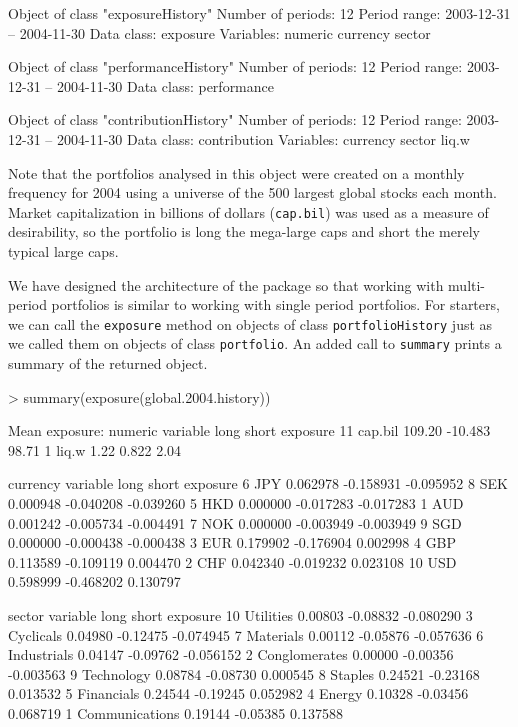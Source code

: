 \documentclass[a4paper]{report}
\begin{document}
\begin{article}
\begin{Schunk}
\begin{Soutput}
Object of class "exposureHistory"
Number of periods: 12 
Period range: 2003-12-31 -- 2004-11-30 
Data class: exposure 
Variables: numeric currency sector 

Object of class "performanceHistory"
Number of periods: 12 
Period range: 2003-12-31 -- 2004-11-30 
Data class: performance 

Object of class "contributionHistory"
Number of periods: 12 
Period range: 2003-12-31 -- 2004-11-30 
Data class: contribution 
Variables: currency sector liq.w 
\end{Soutput}
\end{Schunk}

Note that the portfolios analysed in this object were created on a
monthly frequency for 2004 using a universe of the 500 largest global
stocks each month. Market capitalization in billions of dollars
(\texttt{cap.bil}) was used as a measure of desirability, so the
portfolio is long the mega-large caps and short the merely typical
large caps.

We have designed the architecture of the  package so
that working with multi-period portfolios is similar to working with
single period portfolios. For starters, we can call the
\texttt{exposure} method on objects of class \texttt{portfolioHistory}
just as we called them on objects of class \texttt{portfolio}.  An
added call to \texttt{summary} prints a summary of the returned
object.

\begin{Schunk}
\begin{Sinput}
> summary(exposure(global.2004.history))
\end{Sinput}
\begin{Soutput}
Mean exposure:
numeric 
   variable   long   short exposure
11  cap.bil 109.20 -10.483    98.71
1     liq.w   1.22   0.822     2.04

currency 
   variable     long     short  exposure
6       JPY 0.062978 -0.158931 -0.095952
8       SEK 0.000948 -0.040208 -0.039260
5       HKD 0.000000 -0.017283 -0.017283
1       AUD 0.001242 -0.005734 -0.004491
7       NOK 0.000000 -0.003949 -0.003949
9       SGD 0.000000 -0.000438 -0.000438
3       EUR 0.179902 -0.176904  0.002998
4       GBP 0.113589 -0.109119  0.004470
2       CHF 0.042340 -0.019232  0.023108
10      USD 0.598999 -0.468202  0.130797

sector 
         variable    long    short  exposure
10      Utilities 0.00803 -0.08832 -0.080290
3       Cyclicals 0.04980 -0.12475 -0.074945
7       Materials 0.00112 -0.05876 -0.057636
6     Industrials 0.04147 -0.09762 -0.056152
2   Conglomerates 0.00000 -0.00356 -0.003563
9      Technology 0.08784 -0.08730  0.000545
8         Staples 0.24521 -0.23168  0.013532
5      Financials 0.24544 -0.19245  0.052982
4          Energy 0.10328 -0.03456  0.068719
1  Communications 0.19144 -0.05385  0.137588
\end{Soutput}
\end{Schunk}


\end{article}
\end{document}
